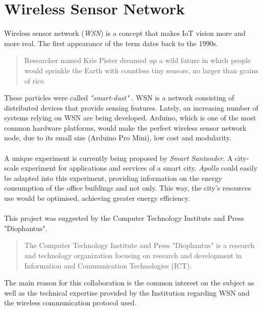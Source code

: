 \documentclass[12pt,a4paper,draft]{report}
\begin{document}
\section{Wireless Sensor Network}
%
Wireless sensor network (\textit{WSN}) is a concept that makes IoT vision more and more real.
The first appearance of the term dates back to the 1990s.
\begin{quote}
    Researcher named Kris Pister dreamed up a wild future in which people would sprinkle the Earth with countless tiny sensors, no larger than grains of rice.
\end{quote} %
These particles were called \textit{"smart-dust"} \cite{website:smartdust}.
WSN is a network consisting of distributed devices that provide sensing features.
Lately, an increasing number of systems relying on WSN are being developed.
Arduino, which is one of the most common hardware platforms, would make the perfect wireless sensor network node, due to its small size (Arduino Pro Mini), low cost and modularity.\\
\ \\
A unique experiment is currently being proposed by \textit{Smart Santander}.
A city-scale experiment for applications and services of a smart city.
\emph{Apollo} could easily be adapted into this experiment, providing information on the energy consumption of the office buildings and not only.
This way, the city's resources use would be optimised, achieving greater energy efficiency.\\
\ \\
%
This project was suggested by the Computer Technology Institute and Press "Diophantus".  %
%
\begin{quote}
	The Computer Technology Institute and Press "Diophantus" is a research and technology organization focusing on research and development in Information and Communication Technologies (ICT)\cite{website:cti}.
\end{quote} %
%
The main reason for this collaboration is the common interest on the subject as well as the technical expertise provided by the Institution regarding WSN and the wireless communication protocol used.
%
\newpage
%
\end{document}
